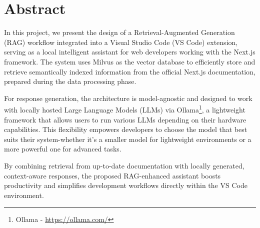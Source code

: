 \chapter*{Abstract}

In this project, we present the design of a Retrieval-Augmented Generation (RAG) workflow integrated into a Visual Studio Code (VS Code) extension, serving as a local intelligent assistant for web developers working with the Next.js framework. The system uses Milvus \cite{wang2021milvus} as the vector database to efficiently store and retrieve semantically indexed information from the official Next.js documentation, prepared during the data processing phase.

For response generation, the architecture is model-agnostic and designed to work with locally hosted Large Language Models (LLMs) via Ollama\footnote{\label{ollama}Ollama - \url{https://ollama.com/}}, a lightweight framework that allows users to run various LLMs depending on their hardware capabilities. This flexibility empowers developers to choose the model that best suits their system-whether it's a smaller model for lightweight environments or a more powerful one for advanced tasks.

By combining retrieval from up-to-date documentation with locally generated, context-aware responses, the proposed RAG-enhanced assistant boosts productivity and simplifies development workflows directly within the VS Code environment.

